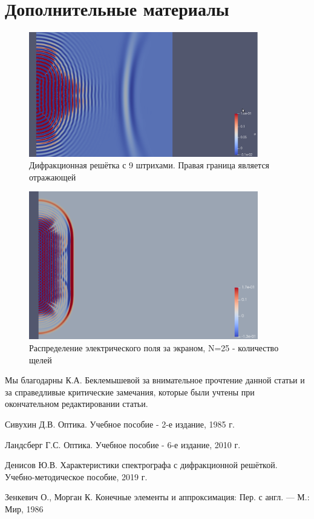 \documentclass[
11pt,%
tightenlines,%
twoside,%
onecolumn,%
nofloats,%
nobibnotes,%
nofootinbib,%
superscriptaddress,%
noshowpacs,%
centertags]%
{revtex4}
\begin{document}
\section{Дополнительные материалы}
\begin{figure}[h]
    \centering
    \includegraphics[width=10cm]{N=9_solution.png}
    \caption{Дифракционная решётка с 9 штрихами. Правая граница является отражающей}
    \label{fig:1}
\end{figure}

\begin{figure}[h]
    \centering
    \includegraphics[width=10cm]{N=25__25.png}
    \caption{Распределение электрического поля за экраном, N=25 - количество щелей}
    \label{fig:1}
\end{figure}

\begin{acknowledgments}
    Мы благодарны К.А. Беклемышевой за внимательное прочтение данной статьи и за справедливые критические
    замечания, которые были учтены при окончательном редактировании статьи.
\end{acknowledgments}


\begin{thebibliography}{99}
    Сивухин Д.В. Оптика. Учебное пособие - 2-е издание, 1985 г.

    Ландсберг Г.С. Оптика. Учебное пособие - 6-е издание, 2010 г.

    Денисов Ю.В. Характеристики спектрографа с дифракционной решёткой. Учебно-методическое пособие, 2019 г.
    
    Зенкевич О., Морган К. Конечные элементы и аппроксимация: Пер. с англ. — М.: Мир, 1986    
\end{thebibliography}
\end{document}
